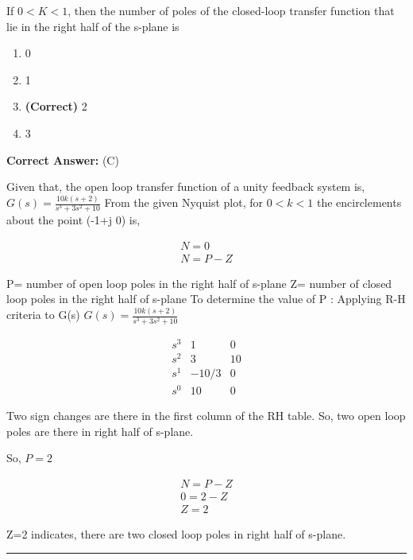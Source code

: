 \documentclass[11pt,a4paper]{article}
\begin{document}
 If $0 < K < 1$, then the number of poles of the closed-loop transfer function that lie in the right half of the s-plane is


\begin{enumerate}[label=(\Alph*)]
    \item 0
    \item 1
    \item \textbf{(Correct)} 2
    \item 3
\end{enumerate}

\noindent \textbf{Correct Answer:} (C)

\begin{tcolorbox}[solbox, title=Detailed Solution -- Question 46]
Given that, the open loop transfer function of a  unity feedback system is,
$G(s) =\frac{10 k(s+2)}{s^{3}+3 s^{2}+10}$
 From the given Nyquist plot, for $0 < k < 1$ the encirclements about the point (-1+j 0) is,

\[
\begin{array}{l} N=0 \\ N=P-Z \end{array}
\]

 P= number of open loop poles in the right half of s-plane
 Z= number of closed loop poles in the right half of s-plane
 To determine the value of P :
 Applying R-H criteria to G(s) 
$G(s)=\frac{10 k(s+2)}{s^{3}+3 s^{2}+10}$

\[
\begin{array}{c|cc} s^{3} & 1 & 0 \\ s^{2} & 3 & 10 \\ s^{1} & -10 / 3 & 0 \\ s^{0} & 10 & 0 \end{array}
\]

Two sign changes are there in the first column of
the RH table. So, two open loop poles are there in
right half of s-plane.

So,
$P=2$

\[
\begin{array}{l}
N=P-Z \\
0=2-Z \\
Z=2
\end{array}
\]

Z=2 indicates, there are two closed loop poles
in right half of s-plane.
\end{tcolorbox}

\vspace{1.5em}
\hrule
\vspace{1.5em}
\end{document}
